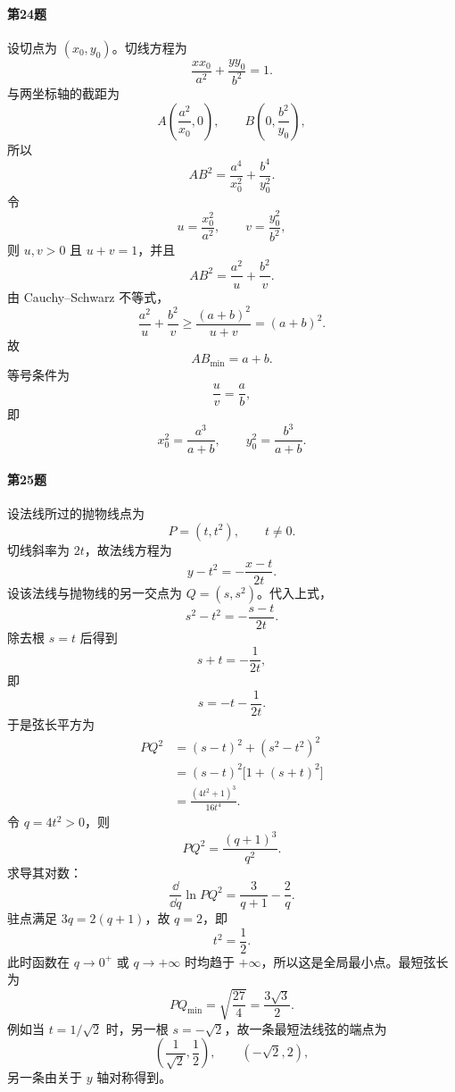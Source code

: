 \paragraph{第24题}
\begin{xsolution}
设切点为 $(x_0,y_0)$。切线方程为
\[
  \frac{xx_0}{a^2}+\frac{yy_0}{b^2}=1.
\]
与两坐标轴的截距为
\[
  A\left(\frac{a^2}{x_0},0\right),
  \qquad
  B\left(0,\frac{b^2}{y_0}\right),
\]
所以
\[
  AB^2=\frac{a^4}{x_0^2}+\frac{b^4}{y_0^2}.
\]
令
\[
  u=\frac{x_0^2}{a^2},
  \qquad
  v=\frac{y_0^2}{b^2},
\]
则 $u,v>0$ 且 $u+v=1$，并且
\[
  AB^2=\frac{a^2}{u}+\frac{b^2}{v}.
\]
由 Cauchy--Schwarz 不等式，
\[
  \frac{a^2}{u}+\frac{b^2}{v}
  \ge\frac{(a+b)^2}{u+v}=(a+b)^2.
\]
故
\[
  AB_{\min}=a+b.
\]
等号条件为
\[
  \frac{u}{v}=\frac ab,
\]
即
\[
  x_0^2=\frac{a^3}{a+b},
  \qquad
  y_0^2=\frac{b^3}{a+b}.
\]
\end{xsolution}

\paragraph{第25题}
\begin{xsolution}
设法线所过的抛物线点为
\[
  P=(t,t^2),
  \qquad t\ne0.
\]
切线斜率为 $2t$，故法线方程为
\[
  y-t^2=-\frac{x-t}{2t}.
\]
设该法线与抛物线的另一交点为 $Q=(s,s^2)$。代入上式，
\[
  s^2-t^2=-\frac{s-t}{2t}.
\]
除去根 $s=t$ 后得到
\[
  s+t=-\frac1{2t},
\]
即
\[
  s=-t-\frac1{2t}.
\]
于是弦长平方为
\[
\begin{aligned}
  PQ^2
  &=(s-t)^2+(s^2-t^2)^2\\
  &=(s-t)^2\bigl[1+(s+t)^2\bigr]\\
  &=\frac{(4t^2+1)^3}{16t^4}.
\end{aligned}
\]
令 $q=4t^2>0$，则
\[
  PQ^2=\frac{(q+1)^3}{q^2}.
\]
求导其对数：
\[
  \frac{\dd}{\dd q}\ln PQ^2
  =\frac3{q+1}-\frac2q.
\]
驻点满足 $3q=2(q+1)$，故 $q=2$，即
\[
  t^2=\frac12.
\]
此时函数在 $q\to0^+$ 或 $q\to+\infty$ 时均趋于 $+\infty$，所以这是全局最小点。最短弦长为
\[
  PQ_{\min}=\sqrt{\frac{27}{4}}=\frac{3\sqrt3}{2}.
\]
例如当 $t=1/\sqrt2$ 时，另一根 $s=-\sqrt2$，故一条最短法线弦的端点为
\[
  \left(\frac1{\sqrt2},\frac12\right),
  \qquad
  (-\sqrt2,2),
\]
另一条由关于 $y$ 轴对称得到。
\end{xsolution}

